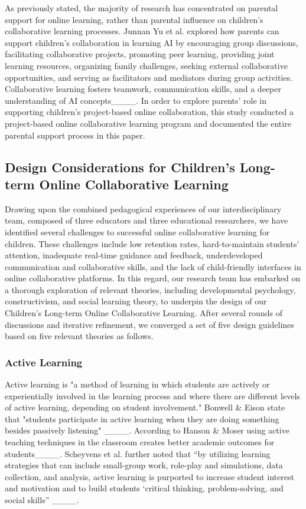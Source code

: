 As previously stated, the majority of research has concentrated on parental support for online learning, rather than parental influence on children's collaborative learning processes. Junnan Yu et al. explored how parents can support children's collaboration in learning AI by encouraging group discussions, facilitating collaborative projects, promoting peer learning, providing joint learning resources, organizing family challenges, seeking external collaborative opportunities, and serving as facilitators and mediators during group activities. Collaborative learning fosters teamwork, communication skills, and a deeper understanding of AI concepts____. In order to explore parents' role in supporting children's project-based online collaboration, this study conducted a project-based online collaborative learning program and documented the entire parental support process in this paper.

\subsection{Design Considerations for Children's Long-term Online Collaborative Learning}
Drawing upon the combined pedagogical experiences of our interdisciplinary team, composed of three educators and three educational researchers, we have identified several challenges to successful online collaborative learning for children. These challenges include low retention rates, hard-to-maintain students' attention, inadequate real-time guidance and feedback, underdeveloped communication and collaborative skills, and the lack of child-friendly interfaces in online collaborative platforms. In this regard, our research team has embarked on a thorough exploration of relevant theories, including developmental psychology, constructivism, and social learning theory, to underpin the design of our Children's Long-term Online Collaborative Learning. After several rounds of discussions and iterative refinement, we converged a set of five design guidelines based on five relevant theories as follows. 

\subsubsection{Active Learning}
Active learning is "a method of learning in which students are actively or experientially involved in the learning process and where there are different levels of active learning, depending on student involvement." Bonwell \& Eison state that "students participate in active learning when they are doing something besides passively listening" ____. According to Hanson \& Moser using active teaching techniques in the classroom creates better academic outcomes for students____. Scheyvens et al. further noted that “by utilizing learning strategies that can include small-group work, role-play and simulations, data collection, and analysis, active learning is purported to increase student interest and motivation and to build students ‘critical thinking, problem-solving, and social skills” ____.

